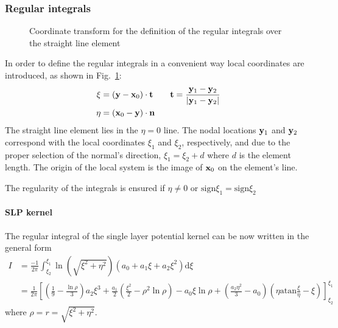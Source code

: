 \documentclass[a4paper,11pt]{article}
\newcommand{\td}{\mathrm{d}}
\newcommand{\sign}{\mathrm{sign}}
\newcommand{\atan}{\mathrm{atan}}
\begin{document}
\subsubsection{Regular integrals}

\begin{figure}
\center
{}
\caption{Coordinate transform for the definition of the regular integrals over the straight line element}
\label{fig:regular_local}
\end{figure}

In order to define the regular integrals in a convenient way local coordinates are introduced, as shown in Fig.~\ref{fig:regular_local}:
%
\begin{align}
\xi &= ({\bf y} - {\bf x}_0) \cdot {\bf t} \qquad {\bf t} = \frac{{\bf y}_1 - {\bf y}_2}{|{\bf y}_1 - {\bf y}_2|} \nonumber \\
\eta &= ({\bf x}_0 - {\bf y}) \cdot {\bf n}
\end{align}
%
The straight line element lies in the $\eta = 0$ line. The nodal locations ${\bf y}_1$ and ${\bf y}_2$ correspond with the local coordinates $\xi_1$ and $\xi_2$, respectively, and due to the proper selection of the normal's direction, $\xi_1 = \xi_2 + d$ where $d$ is the element length. The origin of the local system is the image of ${\bf x}_0$ on the element's line.

The regularity of the integrals is ensured if $\eta \ne 0$ or $\sign \xi_1 = \sign \xi_2$


\paragraph{SLP kernel}

The regular integral of the single layer potential kernel can be now written in the general form
%
\begin{align}
I &= \frac{-1}{2\pi} \int_{\xi_2}^{\xi_1} \ln\left(\sqrt{\xi^2+\eta^2}\right) \left(a_0 + a_1 \xi + a_2 \xi^2\right) \td \xi \\
 &= \frac{1}{2\pi} \left[
\left(\frac{1}{9} - \frac{\ln \rho}{3}\right) a_2 \xi^3
+ \frac{a_1}{2} \left(\frac{\xi^2}{2}
- \rho^2 \ln \rho\right)
- a_0 \xi \ln \rho
+ \left(\frac{a_2 \eta^2}{3} - a_0 \right) \left(\eta \atan\frac{\xi}{\eta} - \xi\right)
\right]_{\xi_2}^{\xi_1} \nonumber
\end{align}
%
where $\rho = r = \sqrt{\xi^2+\eta^2}$.
\end{document}
